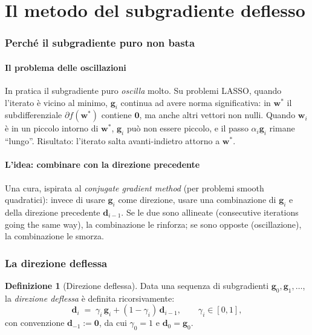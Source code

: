 \documentclass[11pt,a4paper]{article}
\newcommand{\bw}{\mathbf{w}}
\newcommand{\bg}{\mathbf{g}}
\newcommand{\bd}{\mathbf{d}}
\newcommand{\bzero}{\mathbf{0}}
\theoremstyle{definition}
\newtheorem{definition}[theorem]{Definizione}
\begin{document}
\part{Il metodo del subgradiente deflesso}

\section{Perché il subgradiente puro non basta}
\label{sec:why-deflect}

\subsection{Il problema delle oscillazioni}

In pratica il subgradiente puro \emph{oscilla} molto. Su problemi LASSO, quando l'iterato è vicino al minimo, $\bg_i$ continua ad avere norma significativa: in $\bw^*$ il subdifferenziale $\partial f(\bw^*)$ contiene $\bzero$, ma anche altri vettori non nulli. Quando $\bw_i$ è in un piccolo intorno di $\bw^*$, $\bg_i$ può non essere piccolo, e il passo $\alpha_i\bg_i$ rimane ``lungo''. Risultato: l'iterato salta avanti-indietro attorno a $\bw^*$.

\subsection{L'idea: combinare con la direzione precedente}

Una cura, ispirata al \emph{conjugate gradient method} (per problemi smooth quadratici): invece di usare $\bg_i$ come direzione, usare una combinazione di $\bg_i$ e della direzione precedente $\bd_{i-1}$. Se le due sono allineate (consecutive iterations going the same way), la combinazione le rinforza; se sono opposte (oscillazione), la combinazione le smorza.

\section{La direzione deflessa}
\label{sec:deflected-dir}

\begin{definition}[Direzione deflessa]
\label{def:def-dir}
Data una sequenza di subgradienti $\bg_0, \bg_1, \dots$, la \emph{direzione deflessa} è definita ricorsivamente:
\[
\bd_i \;=\; \gamma_i\,\bg_i + (1-\gamma_i)\,\bd_{i-1},\qquad \gamma_i \in [0,1],
\]
con convenzione $\bd_{-1} := \bzero$, da cui $\gamma_0 = 1$ e $\bd_0 = \bg_0$.
\end{definition}
\end{document}
